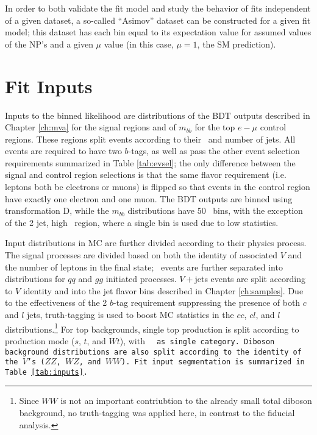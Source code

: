 In order to both validate the fit model and study the behavior of fits independent of a given dataset, a so-called ``Asimov'' dataset can be constructed for a given fit model; this dataset has each bin equal to its expectation value for assumed values of the NP's and a given $\mu$ value (in this case, $\mu=1$, the SM prediction).

\section{Fit Inputs}
\label{ssec:inputs}
Inputs to the binned likelihood are distributions of the BDT outputs described in Chapter \ref{ch:mva} for the signal regions and of $m_{bb}$ for the top $e-\mu$ control regions.  These regions split events according to their \ptv\, and number of jets.  All events are required to have two $b$-tags, as well as pass the other event selection requirements summarized in Table \ref{tab:evsel}; the only difference between the signal and control region selections is that the same flavor requirement (i.e. leptons both be electrons or muons) is flipped so that events in the control region have exactly one electron and one muon.  The BDT outputs are binned using transformation D, while the $m_{bb}$ distributions have 50 \GeV\, bins, with the exception of the 2 jet, high \ptv\, region, where a single bin is used due to low statistics.

Input distributions in MC are further divided according to their physics process.  The signal processes are divided based on both the identity of associated $V$ and the number of leptons in the final state; \ZH\, events are further separated into distributions for $qq$ and $gg$ initiated processes.  $V+$jets events are split according to $V$ identity and into the jet flavor bins described in Chapter \ref{ch:samples}.  Due to the effectiveness of the 2 $b$-tag requirement suppressing the presence of both $c$ and $l$ jets, truth-tagging is used to boost MC statistics in the $cc$, $cl$, and $l$ distributions.\footnote{Since $WW$ is not an important contriubtion to the already small total diboson background, no truth-tagging was applied here, in contrast to the fiducial analysis.}  For top backgrounds, single top production is split according to production mode ($s$, $t$, and $Wt$), with \tt\, as single category.  Diboson background distributions are also split according to the identity of the $V$'s ($ZZ$, $WZ$, and $WW$).  Fit input segmentation is summarized in Table \ref{tab:inputs}.

